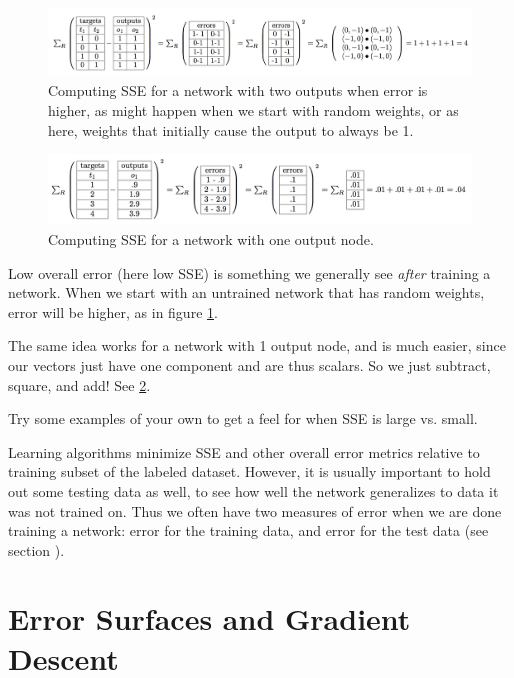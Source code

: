 \begin{figure}[h]
\centering
\includegraphics[scale=.5]{./images/ErrorComputation_2_high.png}
\caption[Jeff Yoshimi.]{Computing SSE for a network with two outputs when error is higher, as might happen when we start with random weights, or as here, weights that initially cause the output to always be 1.}
\label{error_computation2_high}
\end{figure}

\begin{figure}[h]
\centering
\includegraphics[scale=.5]{./images/ErrorComputation_1.png}
\caption[Jeff Yoshimi.]{Computing SSE for a network with one output node.}
\label{error_computation1}
\end{figure}

Low overall error (here low SSE) is something we generally see \emph{after} training a  network. When we start with an untrained network that has random weights, error will be higher, as in figure \ref{error_computation2_high}.

The same idea works for a network with 1 output node, and is much easier, since our vectors just have one component and are thus scalars. So we just subtract, square, and add!  See \ref{error_computation1}.

Try some examples of your own to get a feel for when SSE is large vs. small.

Learning algorithms minimize SSE and other overall error metrics relative to training subset of the labeled dataset. However, it is usually important to hold out some testing data as well, to see how well the network generalizes to data it was not trained on. Thus we often have two measures of error when we are done training a network: error for the training data, and error for the test data (see section ).

\section{Error Surfaces and Gradient Descent}\label{sect_gradient_descent}

